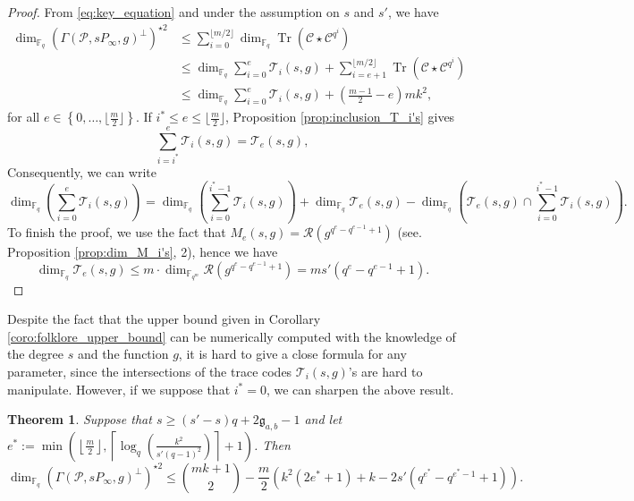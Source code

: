 \documentclass[a4paper]{amsart}
\newtheorem{thm}{Theorem}[section]
\theoremstyle{definition}
\theoremstyle{remark}
\DeclareMathOperator{\trace}{Tr}
\newcommand{\calP}{\mathcal{P}}
\newcommand{\calC}{\mathcal{C}}
\newcommand{\calR}{\mathcal{R}}
\newcommand{\calT}{\mathcal{T}}
\newcommand{\fqm}{\mathbb{F}_{q^m}}
\newcommand{\fq}{\mathbb{F}_{q}}
\newcommand{\Tr}[1]{\trace\!\left(#1\right)}
\newcommand{\set}[1]{\left\{#1\right\}}
\begin{document}
\begin{proof}
From \eqref{eq:key_equation} and under the assumption on $s$ and $s'$, we have
        \begin{align*}
        \dim_{\fq}\left(\Gamma(\calP,sP_\infty,g)^{\perp}\right)^{\star 2}
        & \leq \sum\limits_{i=0}^{\lfloor m/2 \rfloor} \dim_{\fq} \Tr{\calC \star                     \calC^{q^i}} \\
        & \leq \dim_{\fq} \sum\limits_{i=0}^{e}\calT_i(s,g) + \sum\limits_{i=e+1}^{\lfloor m/2 \rfloor} \Tr{\calC \star \calC^{q^i}} \\
                & \leq \dim_{\fq} \sum\limits_{i=0}^{e}\calT_i(s,g) + \left( \frac{m-1}{2} -e \right)mk^2,
        \end{align*}
 for all $e \in \set{0,\dots,\lfloor \frac{m}{2} \rfloor}$. If $i^* \leq e \leq \lfloor \frac{m}{2} \rfloor$,  Proposition \ref{prop:inclusion_T_i's} gives
\[\sum\limits_{i=i^*}^e \calT_i(s,g) = \calT_e(s,g),\]
Consequently, we can write 
$$\dim_{\fq} \left(\sum\limits_{i=0}^{e}\calT_i(s,g)\right) = \dim_{\fq} \left(\sum\limits_{i=0}^{i^*-1}\calT_i(s,g)\right) + \dim_{\fq}\calT_e(s,g) - \dim_{\fq} \left( \calT_e(s,g) \cap   \sum\limits_{i=0}^{i^*-1} \calT_i(s,g)\right).$$
To finish the proof, we use the fact that $M_e(s,g) = \calR\left(g^{q^e-q^{e-1}+1}\right)$ (see. Proposition \ref{prop:dim_M_i's}, 2), hence we have 
$$\dim_{\fq}\calT_e(s,g) \leq m \cdot \dim_{\fqm} \calR\left(g^{q^e-q^{e-1}+1}\right) = m s' (q^e-q^{e-1}+1).$$
\end{proof}

Despite the fact that the upper bound given in Corollary \ref{coro:folklore_upper_bound} can be numerically computed with the knowledge of the degree $s$ and the function $g$, it is hard to give a close formula for any parameter, since the intersections of the trace codes $\calT_i(s,g)$'s are hard to manipulate. However, if we suppose that $i^*=0$, we can sharpen the above result.

\begin{thm} \label{thm:bound_with_T_i's_inclusion} 
Suppose that $s \geq (s'-s)q+2\mathfrak{g}_{a,b}-1$ and let $e^* := \min\left(\left\lfloor \frac{m}{2} \right\rfloor, \left\lceil \log_q\left(\frac{k^2}{s'(q-1)^2}\right)\right\rceil+1\right)$. Then
$$\dim_{\fq} (\Gamma(\calP,sP_\infty,g)^{\perp})^{\star 2}\leq \binom{mk+1}{2} - \dfrac{m}{2}(k^2(2e^*+1)+k-2s'(q^{e^*}-q^{e^*-1}+1)). $$
\end{thm}
\end{document}
